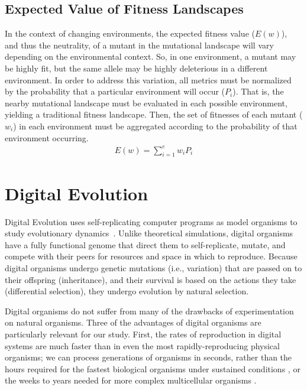 \documentclass[PhD]{msu-thesis}
\begin{document}
\subsection{Expected Value of Fitness Landscapes}
In the context of changing environments, the expected fitness value ($E(w)$), and thus the neutrality, of a mutant in the mutational landscape will vary depending on the environmental context. So, in one environment, a mutant may be highly fit, but the same allele may be highly deleterious in a different environment. In order to address this variation, all metrics must be normalized by the probability that a particular environment will occur ($P_i$). That is, the nearby mutational landscape must be evaluated in each possible environment, yielding a traditional fitness landscape. Then, the set of fitnesses of each mutant ($w_i$) in each environment must be aggregated according to the probability of that environment occurring.
\begin{eqnarray}
\label{eq:expected_fitness_value}
	E(w) = \displaystyle\sum_{i=1}^{e} w_i P_i
\end{eqnarray}

\section{Digital Evolution}

Digital Evolution uses self-replicating computer programs as model organisms to study evolutionary dynamics~\cite{mckinley_harnessing_2008}. Unlike theoretical simulations, digital organisms have a fully functional genome that direct them to self-replicate, mutate, and compete with their peers for resources and space in which to reproduce. Because digital organisms undergo genetic mutations (i.e., variation) that are passed on to their offspring (inheritance), and their survival is based on the actions they take (differential selection), they undergo evolution by natural selection. %

Digital organisms do not suffer from many of the drawbacks of experimentation on natural organisms.  Three of the advantages of digital organisms are particularly relevant for our study.  First, the rates of reproduction in digital systems are much faster than in even the most rapidly-reproducing physical organisms; we can process generations of organisms in seconds, rather than the hours required for the fastest biological organisms under sustained conditions \cite{ryan_evolution_1953,lenski_long-term_1991}, or the weeks to years needed for more complex multicellular organisms \cite{anderson_outcrossing_2010,stearns_experimental_2000}.
\end{document}
